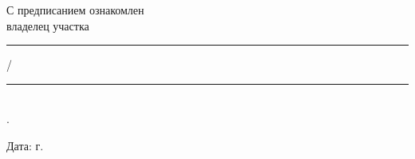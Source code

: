 \noindent С предписанием ознакомлен\\
владелец участка    \hfill   \rule{3cm}{0.1 mm}/\rule{4cm}{0.1 mm}\\
.      \begin{flushright}
	Дата:   г.
\end{flushright}




